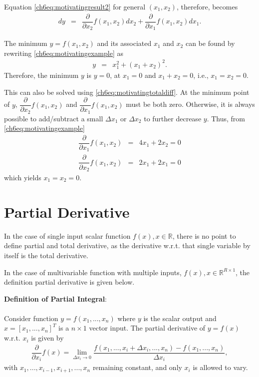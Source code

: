 Equation \eqref{ch6eq:motivatingresult2} for general $(x_1,x_2)$, therefore, becomes
\begin{eqnarray}
	d y &=& \dfrac{\partial}{\partial x_2}f(x_1,x_2) d x_2 + \dfrac{\partial}{\partial x_1}f(x_1,x_2) d x_1. \label{ch6eq:motivatingtotaldiff}
\end{eqnarray}

The minimum $y=f(x_1,x_2)$ and its associated $x_1$ and $x_2$ can be found by rewriting \eqref{ch6eq:motivatingexample} as
\begin{eqnarray}
	y &=& x_1^2 + \left(x_1 + x_2\right)^2. \nonumber
\end{eqnarray}
Therefore, the minimum $y$ is $y=0$, at $x_1 = 0$ and $x_1 + x_2 = 0$, i.e., $x_1 = x_2 = 0$.

This can also be solved using \eqref{ch6eq:motivatingtotaldiff}. At the minimum point of $y$, $\dfrac{\partial}{\partial x_2}f(x_1,x_2)$ and $\dfrac{\partial}{\partial x_1}f(x_1,x_2)$ must be both zero. Otherwise, it is always possible to add/subtract a small $\Delta x_1$ or $\Delta x_2$ to further decrease $y$. Thus, from \eqref{ch6eq:motivatingexample}
\begin{eqnarray}
	\dfrac{\partial}{\partial x_1}f(x_1,x_2) &=& 4x_1 + 2x_2 = 0 \nonumber \\
	\dfrac{\partial}{\partial x_2}f(x_1,x_2) &=& 2x_1 + 2x_1 = 0 \nonumber
\end{eqnarray}
which yields $x_1=x_2=0$.

\section{Partial Derivative} \label{ch6sec:partialtotalderivative}

In the case of single input scalar function $f(x), x \in \mathbb{R}$, there is no point to define partial and total derivative, as the derivative w.r.t. that single variable by itself is the total derivative.

In the case of multivariable function with multiple inputs, $f(x), x \in \mathbb{R}^{R\times 1}$, the definition partial derivative is given below.

\begin{mdframed}
	\textbf{Definition of Partial Integral}:
	\\
	\\
	Consider function $y = f(x_1,...,x_n)$ where $y$ is the scalar output and $x = \left[x_1, ..., x_n\right]^T$ is a $n\times 1$ vector input. The partial derivative of $y=f(x)$ w.r.t. $x_i$ is given by
	\begin{eqnarray}
		\dfrac{\partial}{\partial x_i}f(x) = \lim_{\Delta x_i \rightarrow 0} \dfrac{f(x_1,..., x_i + \Delta x_i,...,x_n)-f(x_1,...,x_n)}{\Delta x_i}, \label{ch6eq:formalpartialderivative}
	\end{eqnarray}
	with $x_1,...,x_{i-1}, x_{i+1},..., x_n$ remaining constant, and only $x_i$ is allowed to vary.
	
\end{mdframed}

